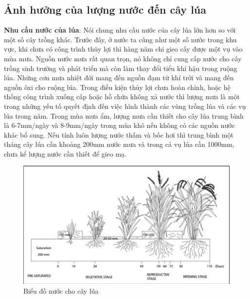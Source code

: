 \documentclass[12pt]{report}
\begin{document}
\subsection{Ảnh hưởng của lượng nước đến cây lúa} %
\label{sub:ảnh_hưởng_của_lượng_nước_đến_cây_lúa}
\begin{flushleft}
	\textbf{Nhu cầu nước của lúa}: Nói chung nhu cầu nước của cây lúa lớn hơn so với một số cây trồng khác. Trước đây, ở nước ta cũng như một số nước trong khu vực, khi chưa có công trình thủy lợi thì hàng năm chỉ gieo cấy được một vụ vào mùa mưa. Nguồn nước mưa rất quan trọn, nó không chỉ cung cấp nước cho cây trồng sinh trưởng và phát triển mà còn làm thay đổi tiểu khí hậu trong ruộng lúa. Những cơn mưa nhiệt đới mang đến nguồn đạm từ khí trời và mang đến nguồn ôxi cho ruộng lúa. Trong điều kiện thủy lợi chưa hoàn chỉnh, hoặc hệ thống công trình xuống cấp hoặc hồ chứa không xả nước thì lượng mưa là một trong những yếu tố quyết định đến việc hình thành các vùng trồng lúa và các vụ lúa trong năm. Trong mùa mưa ẩm, lượng mưa cần thiết cho cây lúa trung bình là 6-7mm/ngày và 8-9mm/ngày trong mùa khô nếu không có các nguồn nước khác bổ sung. Nếu tính luôn lượng nước thấm và bốc hơi thì trung bình một tháng cây lúa cần khoảng 200mm nước mưa và trong cả vụ lúa cần 1000mm, chưa kể lượng nước cần thiết để gieo mạ.

	\begin{figure}[!htbp]
		\centering
		\includegraphics[width = \textwidth]{images/sodonuoc.png}
		\caption{Biểu đồ nước cho cây lúa}
	\end{figure}
\end{flushleft}
\end{document}
